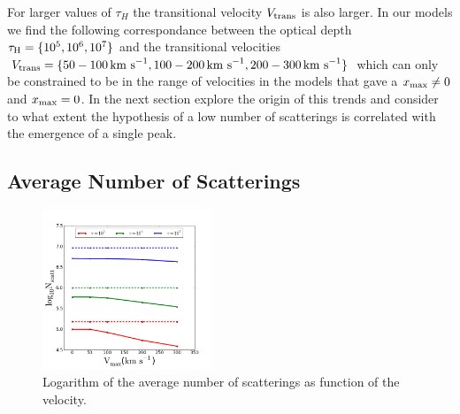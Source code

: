 \documentclass[usenatbib]{mn2e}
\newcommand{\kms}{{\ifmmode{{\mathrm{\,km\ s}^{-1}}}\else{\,km~s$^{-1}$}\fi}}
\begin{document}
For larger values of $\tau_{H}$ the transitional velocity $V_{\rm
  trans}$ is also larger. In our models we find the following
correspondance between the optical depth $\tau_{\rm H}=\{10^5, 10^6,
10^7\}$ and the transitional velocities $V_{\rm
  trans}=\{50-100\kms, 100-200\kms, 200-300\kms\}$ which can only be
constrained to be in the range of velocities in the models that gave a $x_{\rm
  max}\neq 0$ and $x_{\rm max}=0$.   In the next section explore the
origin of this trends and consider to what extent the hypothesis of a low
number of scatterings is correlated with the emergence of a single
peak. 



\subsection{Average Number of Scatterings}


\begin{figure}
    \includegraphics[width=0.45\textwidth]{NscattvsVmax.png}
\caption{Logarithm of the average number of scatterings as function of
  the velocity. \label{fig:Nscatt}}   
\end{figure}
\end{document}
